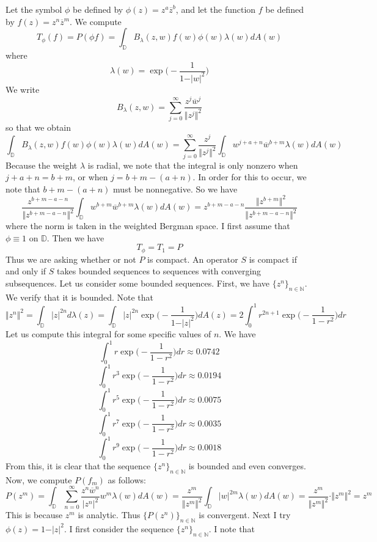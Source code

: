 \documentclass[12pt]{article}
\newcommand{\N}{\mathbb{N}}
\begin{document}
Let the symbol $\phi$ be defined by $\phi(z) = z^a \overline{z}^b$, and let the function $f$ be defined by $f(z) = z^n \overline{z}^m$. We compute
\[
T_\phi(f) = P(\phi f) = \int_\mathbb{D} B_\lambda(z,w) f(w) \phi(w) \lambda(w) dA(w)
\] where
\[
\lambda(w) = \exp\bigg(-\frac{1}{1-\vert w \vert^2}\bigg)
\] We write
\[
B_\lambda(z,w) = \sum_{j=0}^\infty \frac{z^j \overline{w}^j}{\Vert z^j \Vert^2}
\] so that we obtain
\[
\int_\mathbb{D} B_\lambda(z,w) f(w) \phi(w) \lambda(w) dA(w) = \sum_{j=0}^\infty \frac{z^j}{\Vert z^j \Vert ^2} \int_\mathbb{D} w^{j+a+n} \overline{w}^{b+m} \lambda(w) dA(w)
\] Because the weight $\lambda$ is radial, we note that the integral is only nonzero when $j+a+n = b + m$, or when $j = b + m - (a+n)$. In order for this to occur, we note that $b+m - (a+n)$ must be nonnegative. So we have
\[
\frac{z^{b+m-a-n}}{\Vert z^{b+m-a-n} \Vert^2} \int_\mathbb{D}  w^{b+m} \overline{w}^{b+m} \lambda(w) dA(w) = z^{b+m-a-n} \frac{\Vert z^{b+m} \Vert^2}{\Vert z^{b+m-a-n} \Vert^2}
\] where the norm is taken in the weighted Bergman space. I first assume that $\phi \equiv 1$ on $\mathbb{D}$. Then we have
\[
T_\phi = T_1 = P
\] Thus we are asking whether or not $P$ is compact. An operator $S$ is compact if and only if $S$ takes bounded sequences to sequences with converging subsequences. Let us consider some bounded sequences. First, we have $\{z^n\}_{n \in \mathbb{N}}$. We verify that it is bounded. Note that
\[
\Vert z^n \Vert^2  = \int_{\mathbb{D}} \vert z \vert^{2n} d\lambda(z) = \int_{\mathbb{D}} \vert z \vert^{2n} \exp\bigg(-\frac{1}{1-\vert z \vert^2}\bigg) dA(z) = 2 \int_0^1 r^{2n+1} \exp\bigg(-\frac{1}{1-r^2}\bigg) dr
\] Let us compute this integral for some specific values of $n$. We have
\[
\int_0^1 r \exp\bigg(-\frac{1}{1-r^2}\bigg) dr \approx 0.0742
\]
\[
\int_0^1 r^3 \exp\bigg(-\frac{1}{1-r^2}\bigg) dr \approx 0.0194
\]
\[
\int_0^1 r^5 \exp\bigg(-\frac{1}{1-r^2}\bigg) dr \approx 0.0075
\]
\[
\int_0^1 r^7 \exp\bigg(-\frac{1}{1-r^2}\bigg) dr \approx 0.0035
\]
\[
\int_0^1 r^9 \exp\bigg(-\frac{1}{1-r^2}\bigg) dr \approx 0.0018
\] From this, it is clear that the sequence $\{z^n\}_{n\in \mathbb{N}}$ is bounded and even converges. Now, we compute $P(f_m)$ as follows:
\[
P(z^m) = \int_\mathbb{D} \sum_{n = 0}^\infty \frac{z^n \overline{w}^n}{\vert z^n \vert^2} w^m \lambda(w) dA(w) = \frac{z^m}{\Vert z^m \Vert^2} \int_\mathbb{D} \vert w \vert^{2m} \lambda(w) dA(w) = \frac{z^m}{\Vert z^m \Vert^2}\cdot \Vert z^m \Vert^2 = z^m
\] This is because $z^m$ is analytic. Thus $\{P(z^n)\}_{n \in \N}$ is convergent. Next I try $\phi(z) = 1 - \vert z \vert^2$. I first consider the sequence $\{z^n\}_{n \in \N}$. I note that
\end{document}
